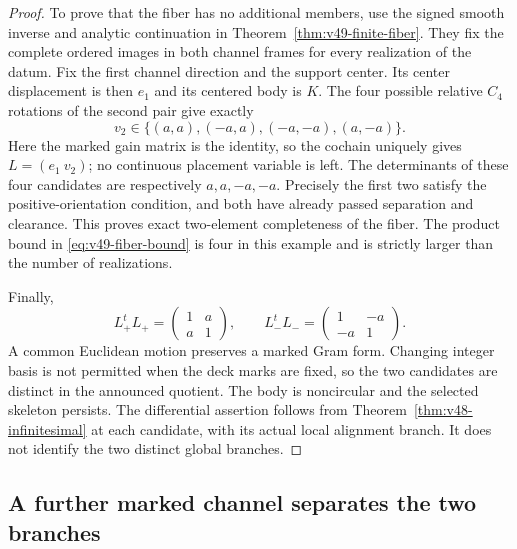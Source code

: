 \begin{proof}
To prove that the fiber has no additional members, use the signed
smooth inverse and analytic continuation in
Theorem~\ref{thm:v49-finite-fiber}.  They fix the complete ordered
images in both channel frames for every realization of the datum.
Fix the first channel direction and the support center.  Its center
displacement is then $e_1$ and its centered body is $K$.  The four
possible relative $C_4$ rotations of the second pair give exactly
\begin{equation}\label{eq:v50-four-candidates}
 v_2\in\{(a,a),(-a,a),(-a,-a),(a,-a)\}.
\end{equation}
Here the marked gain matrix is the identity, so the cochain uniquely
gives $L=(e_1\ v_2)$; no continuous placement variable is left.
The determinants of these four candidates are respectively
$a,a,-a,-a$.  Precisely the first two satisfy the positive-orientation
condition, and both have already passed separation and clearance.
This proves exact two-element completeness of the fiber.  The product
bound in \eqref{eq:v49-fiber-bound} is four in this example and is
strictly larger than the number of realizations.

Finally,
\begin{equation}\label{eq:v50-marked-grams}
 L_+^tL_+=\begin{pmatrix}1&a\\a&1\end{pmatrix},\qquad
 L_-^tL_-=\begin{pmatrix}1&-a\\-a&1\end{pmatrix}.
\end{equation}
A common Euclidean motion preserves a marked Gram form.  Changing
integer basis is not permitted when the deck marks are fixed, so the
two candidates are distinct in the announced quotient.  The body is
noncircular and the selected skeleton persists.  The differential
assertion follows from Theorem~\ref{thm:v48-infinitesimal} at each
candidate, with its actual local alignment branch.  It does not
identify the two distinct global branches.
\end{proof}

\subsection{A further marked channel separates the two branches}
\label{subsec:v50-separator}


